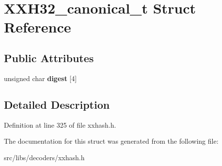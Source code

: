 \hypertarget{structXXH32__canonical__t}{\section{X\-X\-H32\-\_\-canonical\-\_\-t Struct Reference}
\label{structXXH32__canonical__t}
}
\subsection*{Public Attributes}
\begin{DoxyCompactItemize}
\item 
\hypertarget{structXXH32__canonical__t_a85a83578344a5dd1c7a6cc0472230f30}{unsigned char {\bfseries digest} \mbox{[}4\mbox{]}}\label{structXXH32__canonical__t_a85a83578344a5dd1c7a6cc0472230f30}

\end{DoxyCompactItemize}


\subsection{Detailed Description}


Definition at line 325 of file xxhash.\-h.



The documentation for this struct was generated from the following file\-:\begin{DoxyCompactItemize}
\item 
src/libs/decoders/xxhash.\-h\end{DoxyCompactItemize}
